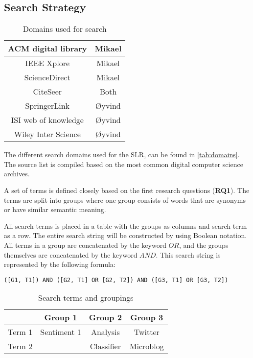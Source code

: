 \subsection{Search Strategy}

\begin{table}[htdp]
\begin{center}
\begin{tabular}{|c|c|}\hline

ACM digital library & Mikael \\\hline
IEEE Xplore & Mikael\\\hline
ScienceDirect & Mikael\\\hline
CiteSeer & Both\\\hline
SpringerLink & Øyvind\\\hline
ISI web of knowledge & Øyvind\\\hline
Wiley Inter Science & Øyvind\\\hline

\end{tabular}
\caption{Domains used for search}
\end{center}
\label{tab:domains}
\end{table}

The different search domains used for the SLR, can be found in \autoref{tab:domains}. The source list is compiled based on the most common digital computer science archives. 

A set of terms is defined closely based on the first research questions (\textbf{RQ1}). The terms are split into groups where one group consists of words that are synonyms or have similar semantic meaning.

All search terms is placed in a table with the groups as columns and search term as a row. The entire search string will be constructed by using Boolean notation. All terms in a group are concatenated by the keyword $OR$, and the groups themselves are concatenated by the keyword $AND$. This search string is represented by the following formula: 

\begin{verbatim}
([G1, T1]) AND ([G2, T1] OR [G2, T2]) AND ([G3, T1] OR [G3, T2]) 
\end{verbatim}

\begin{table}[htdp]
\begin{center}
\begin{tabular}{|c|c|c|c|}\hline

& Group 1 & Group 2 & Group 3 \\\hline
Term 1 & Sentiment 1 & Analysis & Twitter \\\hline
Term 2 &  & Classifier & Microblog \\\hline

\end{tabular}
\caption{Search terms and groupings}
\end{center}
\label{tab:searchterms}
\end{table}

